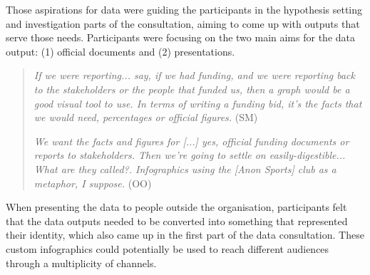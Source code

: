 Those aspirations for data were guiding the participants in the hypothesis setting and investigation parts of the consultation, aiming to come up with outputs that serve those needs. Participants were focusing on the two main aims for the data output: (1) official documents and (2) presentations.
\begin{quote}
    \textit{If we were reporting... say, if we had funding, and we were reporting back to the stakeholders or the people that funded us, then a graph would be a good visual tool to use. In terms of writing a funding bid, it's the facts that we would need, percentages or official figures.} (SM)

    \textit{We want the facts and figures for [...] yes, official funding documents or reports to stakeholders. Then we're going to settle on easily-digestible... What are they called?. Infographics using the [Anon Sports] club as a metaphor, I suppose.} (OO)
\end{quote}
When presenting the data to people outside the organisation, participants felt that the data outputs needed to be converted into something that represented their identity, which also came up in the first part of the data consultation. These custom infographics could potentially be used to reach different audiences through a multiplicity of channels.

